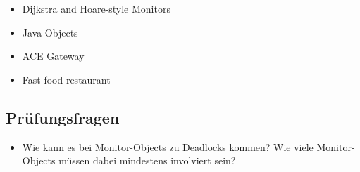 \begin{itemize}
	\item Dijkstra and Hoare-style Monitors
	\item Java Objects
	\item ACE Gateway
	\item Fast food restaurant
\end{itemize}

\subsection{Prüfungsfragen}


\begin{itemize}
	\item Wie kann es bei Monitor-Objects zu Deadlocks kommen? Wie viele Monitor-Objects müssen dabei mindestens involviert sein?
\end{itemize}

